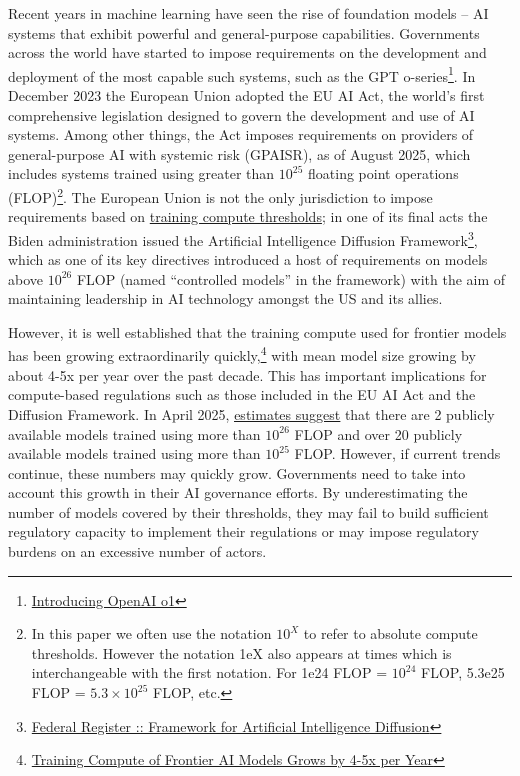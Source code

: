 \documentclass[11pt]{article}
\begin{document}
Recent years in machine learning have seen the rise of foundation models -- AI systems that exhibit powerful and general-purpose capabilities. Governments across the world have started to impose requirements on the development and deployment of the most capable such systems, such as the GPT o-series\footnote{\href{https://openai.com/o1/}{Introducing OpenAI o1}}. In December 2023 the European Union adopted the EU AI Act, the world's first comprehensive legislation designed to govern the development and use of AI systems. Among other things, the Act imposes requirements on providers of general-purpose AI with systemic risk (GPAISR), as of August 2025, which includes systems trained using greater than $10^{25}$ floating point operations (FLOP)\footnote{In this paper we often use the notation $10^X$ to refer to absolute compute thresholds. However the notation 1eX also appears at times which is interchangeable with the first notation. For 1e24 FLOP = $10^{24}$ FLOP, 5.3e25 FLOP = $5.3 \times 10^{25}$ FLOP, etc.}. The European Union is not the only jurisdiction to impose requirements based on \href{https://arxiv.org/abs/2405.10799}{training compute thresholds}; in one of its final acts the Biden administration issued the Artificial Intelligence Diffusion Framework\footnote{\href{https://www.federalregister.gov/documents/2025/01/15/2025-00636/framework-for-artificial-intelligence-diffusion}{Federal Register :: Framework for Artificial Intelligence Diffusion}}, which as one of its key directives introduced a host of requirements on models above $10^{26}$ FLOP (named ``controlled models'' in the framework) with the aim of maintaining leadership in AI technology amongst the US and its allies.

However, it is well established that the training compute used for frontier models has been growing extraordinarily quickly,\footnote{\href{https://epochai.org/blog/training-compute-of-frontier-ai-models-grows-by-4-5x-per-year}{Training Compute of Frontier AI Models Grows by 4-5x per Year}} with mean model size growing by about 4-5x per year over the past decade. This has important implications for compute-based regulations such as those included in the EU AI Act and the Diffusion Framework. In April 2025, \underline{\href{https://epochai.org/data/notable-ai-models}{estimates suggest}} that there are 2 publicly available models trained using more than $10^{26}$ FLOP and over 20 publicly available models trained using more than $10^{25}$ FLOP. However, if current trends continue, these numbers may quickly grow. Governments need to take into account this growth in their AI governance efforts. By underestimating the number of models covered by their thresholds, they may fail to build sufficient regulatory capacity to implement their regulations or may impose regulatory burdens on an excessive number of actors.
\end{document}
